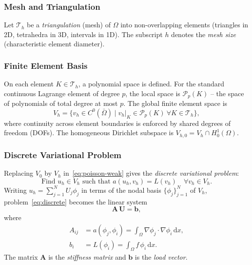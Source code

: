 \documentclass[11pt]{article}
\newcommand{\dx}{\,\mathrm{d}x}
\newcommand{\Grad}{\nabla}
\newcommand{\domain}{\Omega}
\begin{document}
\subsubsection{Mesh and Triangulation}

Let $\mathcal{T}_h$ be a \emph{triangulation} (mesh) of $\domain$ into
non-overlapping elements (triangles in 2D, tetrahedra in 3D, intervals in 1D).
The subscript $h$ denotes the \emph{mesh size} (characteristic element diameter).

\subsubsection{Finite Element Basis}

On each element $K \in \mathcal{T}_h$, a polynomial space is defined.
For the standard continuous Lagrange element of degree $p$, the local space is
$\mathcal{P}_p(K)$ -- the space of polynomials of total degree at most $p$.
The global finite element space is
\begin{equation*}
  V_h = \bigl\{ v_h \in C^0(\bar\domain)
    \mid v_h|_K \in \mathcal{P}_p(K)\ \forall K \in \mathcal{T}_h \bigr\},
\end{equation*}
where continuity across element boundaries is enforced by shared degrees of
freedom (DOFs).
The homogeneous Dirichlet subspace is
$V_{h,0} = V_h \cap H^1_0(\domain)$.

\subsubsection{Discrete Variational Problem}

Replacing $V_0$ by $V_h$ in~\eqref{eq:poisson-weak} gives the
\emph{discrete variational problem}:
\begin{equation}
  \label{eq:discrete}
  \text{Find } u_h \in V_h \text{ such that }
  a(u_h, v_h) = L(v_h) \quad \forall v_h \in V_h.
\end{equation}
Writing $u_h = \sum_{j=1}^N U_j \phi_j$ in terms of the nodal basis
$\{\phi_j\}_{j=1}^N$ of $V_h$, problem~\eqref{eq:discrete} becomes the
linear system
\begin{equation}
  \label{eq:linsys}
  \mathbf{A}\,\mathbf{U} = \mathbf{b},
\end{equation}
where
\begin{align*}
  A_{ij} &= a(\phi_j, \phi_i) = \int_\domain \Grad\phi_j \cdot \Grad\phi_i \dx, \\
  b_i    &= L(\phi_i)        = \int_\domain f\,\phi_i \dx.
\end{align*}
The matrix $\mathbf{A}$ is the \emph{stiffness matrix} and $\mathbf{b}$ is
the \emph{load vector}.
\end{document}
